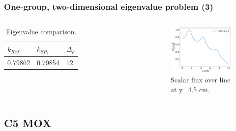 \begin{frame}
\frametitle{One-group, two-dimensional eigenvalue problem (3)}

\begin{columns}
    \column[t]{4cm}
    \begin{table}[htbp!]
      \centering
      \caption{Eigenvalue comparison.}
      \begin{tabular}{lll}
      \toprule
        $k_{Ref}$ & $k_{SP_3}$  & $\Delta_{\rho}$ \\
      \midrule
        0.79862   & 0.79854     & 12        \\
      \bottomrule
      \end{tabular}
    \end{table}

    \column[t]{6cm}
    \begin{figure}[htbp!]
        \begin{center}
            \includegraphics[width=6cm]{figures/flux-output}
        \end{center}
        \caption{Scalar flux over line at y=4.5 cm.}
    \end{figure}
\end{columns}
\end{frame}


\subsection{C5 MOX}

